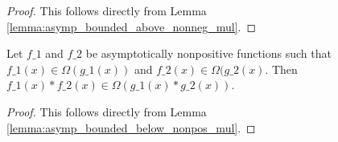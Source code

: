 \begin{proof}
    \leanok
    This follows directly from Lemma \ref{lemma:asymp_bounded_above_nonneg_mul}.
\end{proof}

\begin{lemma}
    \label{lemma:Omega_nonpos_mul}
    \leanok
    Let $f\_1$ and $f\_2$ be asymptotically nonpositive functions such that 
    $f\_1(x) \in \Omega(g\_1(x))$ and $f\_2(x) \in \Omega(g\_2(x)$. 
    Then $f\_1(x) * f\_2(x) \in \Omega(g\_1(x) * g\_2(x))$.
\end{lemma}

\begin{proof}
    \leanok
    This follows directly from Lemma \ref{lemma:asymp_bounded_below_nonpos_mul}.
\end{proof}
